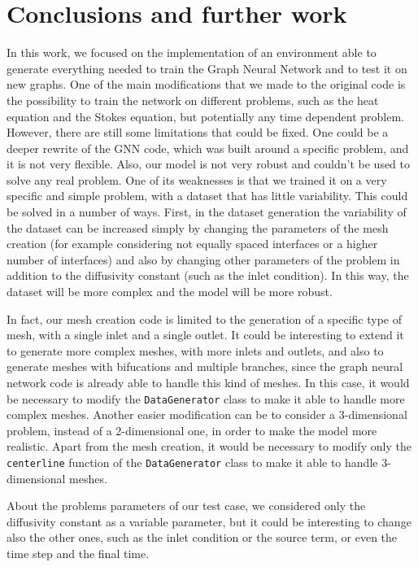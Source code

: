 \documentclass[11pt,a4paper]{article}
\begin{document}


\section{Conclusions and further work}
In this work, we focused on the implementation of an environment able to generate everything needed to train the Graph Neural Network and to test it on new graphs. One of the main modifications that we made to the original code is the possibility to train the network on different problems, such as the heat equation and the Stokes equation, but potentially any time dependent problem.
However, there are still some limitations that could be fixed. One could be a deeper rewrite of the GNN code, which was built around a specific problem, and it is not very flexible. Also, our model is not very robust and couldn't be used to solve any real problem. One of its weaknesses is that we trained it on a very specific and simple problem, with a dataset that has little variability. This could be solved in a number of ways.
First, in the dataset generation the variability of the dataset can be increased simply by changing the parameters of the mesh creation (for example considering not equally spaced interfaces or a higher number of interfaces) and also by changing other parameters of the problem in addition to the diffusivity constant (such as the inlet condition). 
In this way, the dataset will be more complex and the model will be more robust. 

In fact, our mesh creation code is limited to the generation of a specific type of mesh, with a single inlet and a single outlet. It could be interesting to extend it to generate more complex meshes, with more inlets and outlets, and also to generate meshes with bifucations and multiple branches, since the graph neural network code is already able to handle this kind of meshes. In this case, it would be necessary to modify the \texttt{DataGenerator} class to make it able to handle more complex meshes. 
Another easier modification can be to consider a 3-dimensional problem, instead of a 2-dimensional one, in order to make the model more realistic. Apart from the mesh creation, it would be necessary to modify only the \texttt{centerline}  function of the \texttt{DataGenerator} class to make it able to handle 3-dimensional meshes.

About the problems parameters of our test case, we considered only the diffusivity constant as a variable parameter, but it could be interesting to change also the other ones, such as the inlet condition or the source term, or even the time step and the final time.
\end{document}
